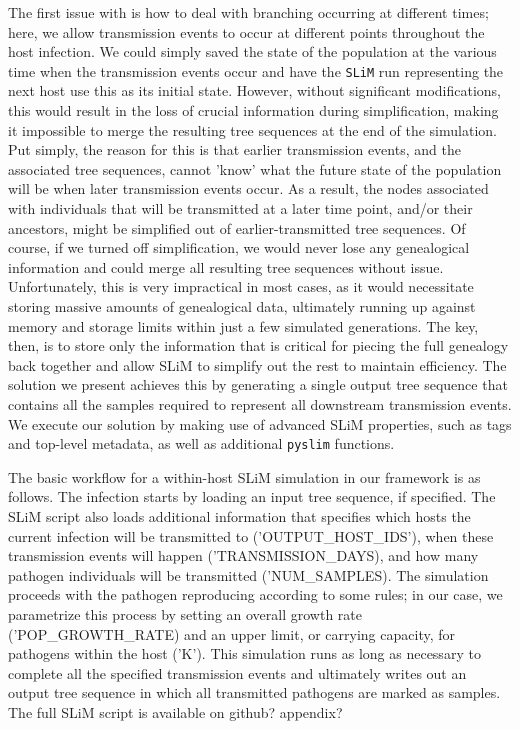 \documentclass[12pt]{article}
\newcommand{\slim}[0]{\texttt{SLiM}\xspace}
\newcommand{\pyslim}[0]{\texttt{pyslim}\xspace}
\begin{document}
The first issue with is how to deal with branching occurring at different times; here, we allow transmission events to occur at different points throughout the host infection.
We could simply saved the state of the population at the various time when the transmission events occur and have the \slim run representing the next host use this
as its initial state. However, without significant modifications, this would result in the loss of crucial information during simplification, making it impossible
to merge the resulting tree sequences at the end of the simulation. Put simply, the reason for this is that earlier transmission events, and
the associated tree sequences, cannot 'know' what the future state of the population will be when later transmission events occur. As a result, the nodes associated with
individuals that will be transmitted at a later time point, and/or their ancestors, might be simplified out of earlier-transmitted tree sequences. Of course, if we turned off
simplification, we would never lose any genealogical information and could merge all resulting tree sequences without issue. Unfortunately, this is very impractical in most cases,
as it would necessitate storing massive amounts of genealogical data, ultimately running up against memory and storage limits within just a few simulated generations.
The key, then, is to store only the information that is critical for piecing the full genealogy back together and allow SLiM to simplify out the rest to maintain efficiency. The
solution we present achieves this by generating a single output tree sequence that contains all the samples required to represent all downstream transmission events.
We execute our solution by making use of advanced SLiM properties, such as tags and top-level metadata, as well as additional \pyslim functions.

The basic workflow for a within-host SLiM simulation in our framework is as follows. The infection starts by loading an input tree sequence, if specified. The SLiM script also
loads additional information that specifies which hosts the current infection will be transmitted to ('OUTPUT_HOST_IDS'), when these transmission events will happen
('TRANSMISSION_DAYS), and how many pathogen individuals will be transmitted ('NUM_SAMPLES). The simulation proceeds with the pathogen reproducing according
to some rules; in our case, we parametrize this process by setting an overall growth rate ('POP_GROWTH_RATE) and an upper limit, or carrying capacity, for pathogens
within the host ('K'). This simulation runs as long as necessary to complete all the specified transmission events and ultimately writes out an output tree sequence in which
all transmitted pathogens are marked as samples. The full SLiM script is available on github? appendix?
\end{document}
